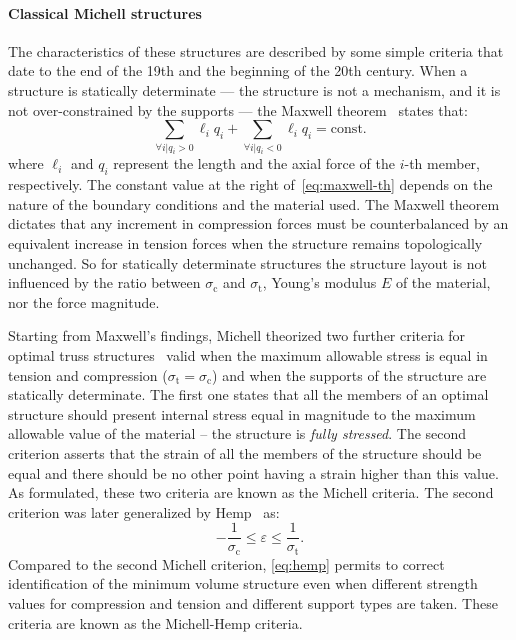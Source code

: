 \paragraph{Classical Michell structures} \label{sec:03_michell}
The characteristics of these structures are described by some simple criteria that date to the end of the 19th and the beginning of the 20th century. When a structure is statically determinate — \ie the structure is not a mechanism, and it is not over-constrained by the supports — the Maxwell theorem~ states that:
\begin{equation} \label{eq:maxwell-th}
    \sum_{\forall i | q_i>0}\ell_iq_i + \sum_{\forall i | q_i<0}\ell_iq_i = \textrm{const.}
\end{equation}
where $\ell_i$ and $q_i$ represent the length and the axial force of the $i$-th member, respectively. The constant value at the right of~\eqref{eq:maxwell-th} depends on the nature of the boundary conditions and the material used. The Maxwell theorem dictates that any increment in compression forces must be counterbalanced by an equivalent increase in tension forces when the structure remains topologically unchanged. So for statically determinate structures the structure layout is not influenced by the ratio between $\sigma_\text{c}$ and $\sigma_\text{t}$, Young's modulus $E$ of the material, nor the force magnitude.

Starting from Maxwell's findings, Michell theorized two further criteria for optimal truss structures~ valid when the maximum allowable stress is equal in tension and compression ($\sigma_\text{t} = \sigma_\text{c}$) and when the supports of the structure are statically determinate. The first one states that all the members of an optimal structure should present internal stress equal in magnitude to the maximum allowable value of the material -- \ie the structure is \textit{fully stressed}. The second criterion asserts that the strain of all the members of the structure should be equal and there should be no other point having a strain higher than this value. As formulated, these two criteria are known as the Michell criteria. The second criterion was later generalized by Hemp~ as:
\begin{equation} \label{eq:hemp}
    -\frac{1}{\sigma_\text{c}}\leq \varepsilon \leq \frac{1}{\sigma_\text{t}}.
\end{equation}
Compared to the second Michell criterion, \eqref{eq:hemp} permits to correct identification of the minimum volume structure even when different strength values for compression and tension and different support types are taken. These criteria are known as the Michell-Hemp criteria.

